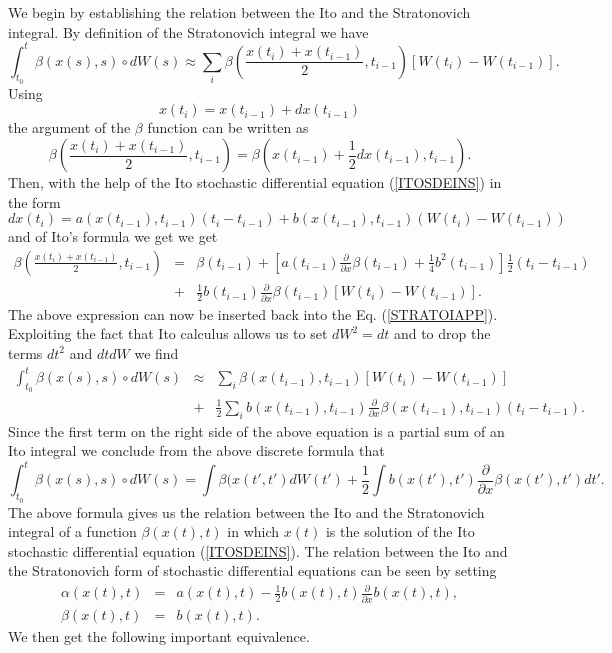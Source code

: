 We begin by establishing the relation between the Ito and the 
Stratonovich integral. By definition of the Stratonovich integral 
we have
\begin{equation}
\label{STRATOIAPP}
\int_{t_0}^t  \beta(x(s),s) \circ dW(s) \approx
 \sum_i \beta \left( \frac{x(t_i) + x(t_{i-1})}{2},t_{i-1} \right)
  [W(t_i) -W(t_{i-1})].
\end{equation}
Using
\begin{equation*}
x(t_i) = x(t_{i-1}) + dx(t_{i-1})
\end{equation*}
the argument of the $\beta$ function can be written as
\begin{equation*}
\beta \left( \frac{x(t_i) + x(t_{i-1})}{2},t_{i-1} \right) =
 \beta \left( x(t_{i-1}) + \frac{1}{2} dx(t_{i-1}) ,t_{i-1}\right).
\end{equation*}
Then, with the help of the Ito stochastic differential equation 
(\ref{ITOSDEINS}) in the form
\begin{equation*}
dx(t_i) = a(x(t_{i-1}),t_{i-1}) (t_i -t_{i-1}) + 
   b(x(t_{i-1}),t_{i-1}) (W(t_i) -W(t_{i-1}))
\end{equation*}
and of Ito's formula we get
we get
\begin{eqnarray*}
\beta \left( \frac{x(t_i) + x(t_{i-1})}{2},t_{i-1} \right) & = &
 \beta(t_{i-1}) + \left[ a(t_{i-1}) \frac{\partial}{\partial x} 
 \beta(t_{i-1}) + \frac{1}{4} b^2(t_{i-1})
                  \right] \frac{1}{2}(t_{i} - t_{i-1}) \\
 &  + & \frac{1}{2} b(t_{i-1}) \frac{\partial}{\partial x} 
 \beta(t_{i-1}) [W(t_i) - W(t_{i-1})].
\end{eqnarray*}
The above expression can now be inserted back into the Eq. 
(\ref{STRATOIAPP}). Exploiting the fact that Ito calculus allows us to set 
$dW^2=dt$ and to drop the terms $dt^2$ and $dtdW$ we find
\begin{eqnarray*}
\int_{t_0}^t  \beta(x(s),s) \circ dW(s) & \approx &
\sum_i \beta(x(t_{i-1}),t_{i-1}) [W(t_i) - W(t_{i-1})] \\
 &  + & \frac{1}{2} \sum_i b(x(t_{i-1}),t_{i-1}) 
 \frac{\partial}{\partial x} \beta(x(t_{i-1}),t_{i-1}) (t_i - 
 t_{i-1}).
\end{eqnarray*}
Since the first term on the right side of the above equation is a
partial sum of an Ito integral we conclude from the above discrete
formula that
\begin{equation}
\int_{t_0}^t  \beta(x(s),s) \circ dW(s) = 
\int  \beta(x(t',t') dW(t') 
 + \frac{1}{2} \int b(x(t'),t') 
 \frac{\partial}{\partial x} \beta(x(t'),t') dt'.
\end{equation}
The above formula gives us the relation between the Ito and the 
Stratonovich integral of a function $\beta(x(t),t)$ in which $x(t)$
is the solution of the Ito stochastic differential equation
(\ref{ITOSDEINS}). The relation between the Ito and the 
Stratonovich form of stochastic differential equations can be seen 
by setting
\begin{eqnarray*}
\alpha(x(t),t) & = & a(x(t),t) - \frac{1}{2} b(x(t),t) 
\frac{\partial}{\partial x} b(x(t),t), \\
\beta(x(t),t) & = & b(x(t),t).
\end{eqnarray*}
We then get the following important equivalence.

